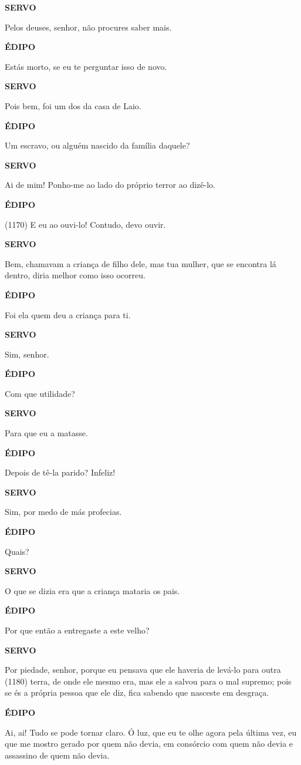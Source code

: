 \textbf{SERVO}

Pelos deuses, senhor, não procures saber mais.

\textbf{ÉDIPO}

Estás morto, se eu te perguntar isso de novo.

\textbf{SERVO}

Pois bem, foi um dos da casa de Laio.

\textbf{ÉDIPO}

Um escravo, ou alguém nascido da família daquele?

\textbf{SERVO}

Ai de mim! Ponho-me ao lado do próprio terror ao dizê-lo.

\textbf{ÉDIPO}

(1170) E eu ao ouvi-lo! Contudo, devo ouvir.

\textbf{SERVO}

Bem, chamavam a criança de filho dele, mas tua mulher, que se encontra
lá dentro, diria melhor como isso ocorreu.

\textbf{ÉDIPO}

Foi ela quem deu a criança para ti.

\textbf{SERVO}

Sim, senhor.

\textbf{ÉDIPO}

Com que utilidade?

\textbf{SERVO}

Para que eu a matasse.

\textbf{ÉDIPO}

Depois de tê-la parido? Infeliz!

\textbf{SERVO}

Sim, por medo de más profecias.

\textbf{ÉDIPO}

Quais?

\textbf{SERVO}

O que se dizia era que a criança mataria os pais.

\textbf{ÉDIPO}

Por que então a entregaste a este velho?

\textbf{SERVO}

Por piedade, senhor, porque eu pensava que ele haveria de levá-lo para
outra (1180) terra, de onde ele mesmo era, mas ele a salvou para o mal
supremo; pois se és a própria pessoa que ele diz, fica sabendo que
nasceste em desgraça.

\textbf{ÉDIPO}

Ai, ai! Tudo se pode tornar claro. Ó luz, que eu te olhe agora pela
última vez, eu que me mostro gerado por quem não devia, em consórcio com
quem não devia e assassino de quem não devia.

